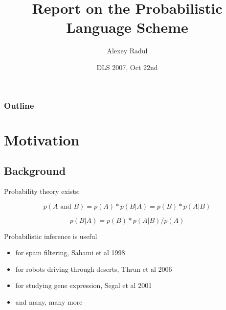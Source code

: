 \documentclass{beamer}
\title[Probabilistic Scheme] %
{Report on the Probabilistic Language Scheme}
\author{Alexey Radul}
\institute[MIT] %
{
  Computer Science and Artificial Intelligence Laboratory\\
  Massachusetts Institute of Technology
}
\date{DLS 2007, Oct 22nd}
\begin{document}
\begin{frame}
  \titlepage
\end{frame}

\begin{frame}
  \frametitle{Outline}
  \tableofcontents
\end{frame}




\section{Motivation}

\subsection{Background}

\begin{frame}

\begin{center}
\Huge Probability theory exists:
\end{center}

  \[ p(A \textrm{ and } B) = p(A) * p(B|A) = p(B) * p(A|B) \]

  \[ p(B|A) = p(B) * p(A|B) / p(A) \]

\end{frame}

\begin{frame}

  {\huge
    Probabilistic inference is useful
  }

  \begin{itemize}
  \item for spam filtering, Sahami et al 1998
  \item for robots driving through deserts, Thrun et al 2006
  \item for studying gene expression, Segal et al 2001
  \item and many, many more
  \end{itemize}
\end{frame}
\end{document}
